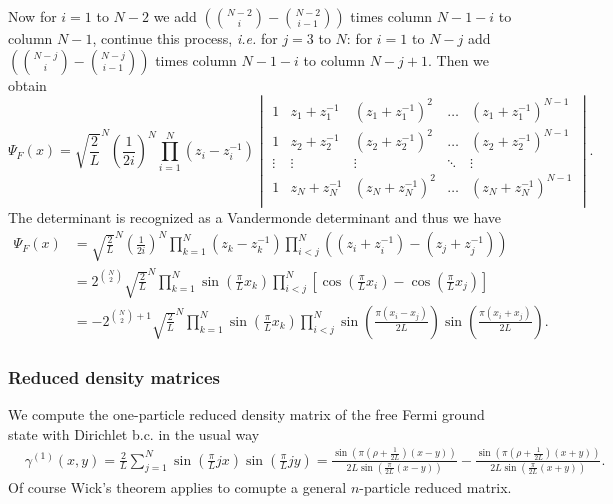 \documentclass[a4paper,11pt]{article}
\newcommand{\ie}{\emph{i.e.} }
\numberwithin{equation}{section}
\begin{document}
	Now for $ i=1 $ to $ N-2 $ we add $ \left(\binom{N-2}{i}-\binom{N-2}{i-1}\right) $ times column $ N-1-i $ to column $ N-1 $, continue this process, \ie for $ j=3 $ to $ N $: for $ i=1 $ to $ N-j $ add  $ \left(\binom{N-j}{i}-\binom{N-j}{i-1}\right) $ times column $ N-1-i $ to column $ N-j+1 $. Then we obtain \begin{equation}
	\Psi_F(x)=\sqrt{\frac{2}{L}}^N\left(\frac{1}{2i}\right)^N\prod_{i=1}^{N}(z_i-z_i^{-1})\begin{vmatrix}
	1&z_1+z_1^{-1}&(z_1+z_1^{-1})^2&\ldots&(z_1+z_1^{-1})^{N-1}\\
	1&z_2+z_2^{-1}&(z_2+z_2^{-1})^2&\ldots&(z_2+z_2^{-1})^{N-1}\\
	\vdots&\vdots&\vdots&\ddots&\vdots\\
	1&z_N+z_N^{-1}&(z_N+z_N^{-1})^2&\ldots&(z_N+z_N^{-1})^{N-1}\\
	\end{vmatrix}.
	\end{equation}
	The determinant is recognized as a Vandermonde determinant and thus we have \begin{equation}
	\begin{aligned}
	\Psi_F(x)&=\sqrt{\frac{2}{L}}^N\left(\frac{1}{2i}\right)^N\prod_{k=1}^{N}(z_k-z_k^{-1})\prod_{i<j}^{N}\left((z_i+z_i^{-1})-(z_j+z_j^{-1})\right)\\
	&=2^{\binom{N}{2}}\sqrt{\frac{2}{L}}^N\prod_{k=1}^{N}\sin\left(\frac{\pi}{L}x_k\right)\prod_{i<j}^{N}\left[\cos\left(\frac{\pi}{L}x_i\right)-\cos\left(\frac{\pi}{L}x_j\right)\right]\\
	&=-2^{\binom{N}{2}+1}\sqrt{\frac{2}{L}}^N\prod_{k=1}^{N}\sin\left(\frac{\pi}{L}x_k\right)\prod_{i<j}^{N}\sin\left(\frac{\pi(x_i-x_j)}{2L}\right)\sin\left(\frac{\pi(x_i+x_j)}{2L}\right)
	.
	\end{aligned}
	\end{equation}
	
	\subsubsection{Reduced density matrices}
	We compute the one-particle reduced density matrix of the free Fermi ground state with Dirichlet b.c. in the usual way\begin{equation}
	\begin{aligned}
	&\gamma^{(1)}(x,y)=\frac{2}{L}\sum_{j=1}^{N}\sin\left(\frac{\pi}{L}jx\right)\sin\left(\frac{\pi}{L} jy\right)=\frac{\sin\left(\pi\left(\rho+\frac{1}{2L}\right)(x-y)\right)}{2L\sin\left(\frac{\pi}{2L}(x-y)\right)}-\frac{\sin\left(\pi\left(\rho+\frac{1}{2L}\right)(x+y)\right)}{2L\sin\left(\frac{\pi}{2L}(x+y)\right)}.
	\end{aligned}
	\end{equation}
	Of course Wick's theorem applies to comupte a general $ n $-particle reduced matrix.
\end{document}
